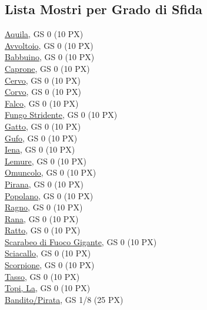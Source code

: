 \pagebreak

\subsection{Lista Mostri per Grado di Sfida}

\begin{multicols}{3}
{\small
\noindent\hyperlink{Aquila}{Aquila}, GS 0 (10 PX)\\
\hyperlink{Avvoltoio}{Avvoltoio}, GS 0 (10 PX)\\
\hyperlink{Babbuino}{Babbuino}, GS 0 (10 PX)\\
\hyperlink{Caprone}{Caprone}, GS 0 (10 PX)\\
\hyperlink{Cervo}{Cervo}, GS 0 (10 PX)\\
\hyperlink{Corvo}{Corvo}, GS 0 (10 PX)\\
\hyperlink{Falco}{Falco}, GS 0 (10 PX)\\
\hyperlink{Fungo Stridente}{Fungo Stridente}, GS 0 (10 PX)\\
\hyperlink{Gatto}{Gatto}, GS 0 (10 PX)\\
\hyperlink{Gufo}{Gufo}, GS 0 (10 PX)\\
\hyperlink{Iena}{Iena}, GS 0 (10 PX)\\
\hyperlink{Lemure}{Lemure}, GS 0 (10 PX)\\
\hyperlink{Omuncolo}{Omuncolo}, GS 0 (10 PX)\\
\hyperlink{Pirana}{Pirana}, GS 0 (10 PX)\\
\hyperlink{Popolano}{Popolano}, GS 0 (10 PX)\\
\hyperlink{Ragno}{Ragno}, GS 0 (10 PX)\\
\hyperlink{Rana}{Rana}, GS 0 (10 PX)\\
\hyperlink{Ratto}{Ratto}, GS 0 (10 PX)\\
\hyperlink{Scarabeo di Fuoco Gigante}{Scarabeo di Fuoco Gigante}, GS 0 (10 PX)\\
\hyperlink{Sciacallo}{Sciacallo}, GS 0 (10 PX)\\
\hyperlink{Scorpione}{Scorpione}, GS 0 (10 PX)\\
\hyperlink{Tasso}{Tasso}, GS 0 (10 PX)\\
\hyperlink{Topi, La}{Topi, La}, GS 0 (10 PX)\\
\hyperlink{Bandito/Pirata}{Bandito/Pirata}, GS 1/8 (25 PX)\\
}
\end{multicols}

